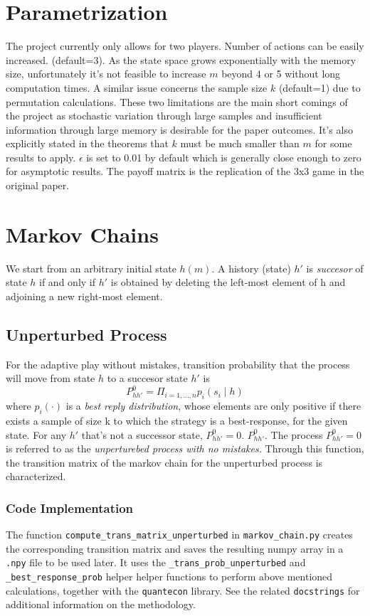 \documentclass[11pt, a4paper, leqno]{article}
\begin{document}
\section{Parametrization} %
\label{subsec:param}
The project currently only allows for two players. Number of actions can be easily increased. (default=3).
As the state space grows exponentially with the memory size, unfortunately it's not feasible to
increase $m$ beyond 4 or 5 without long computation times. A similar issue
concerns the sample size $k$ (default=1) due to permutation calculations. These two limitations are the main short comings
of the project as stochastic variation through large samples and insufficient information through
large memory is desirable for the paper outcomes. It's also explicitly stated in the theorems that $k$ must be much smaller than $m$
for some results to apply. $\epsilon$ is set to 0.01 by default which is generally close enough to
zero for asymptotic results. The payoff matrix is the replication of the 3x3 game in the original paper.


\section{Markov Chains} %
\label{subsec:mc}
We start from an arbitrary initial state $h(m)$. A history (state) $h'$ is \textit{succesor} of
state $h$ if and only if $h'$ is obtained by deleting the left-most element of h and adjoining
a new right-most element.

\subsection{Unperturbed Process} %
\label{subsec:mc_up}

For the adaptive play without mistakes, transition probability that the process will move from state
 $h$ to a succesor state $h'$ is
\[ P_{hh'}^{0} = \Pi_{i=1,...,n} p_i(s_i \mid h) \]
where $ p_i(\cdot)$ is a \textit{best reply distribution}, whose elements are only positive if there
exists a sample of size k to which the strategy is a best-response, for the given state. For any
$h'$ that's not a successor state, $P_{hh'}^{0} = 0$. $P_{hh'}^{0}$. The process $P_{hh'}^{0} = 0$
is referred to as the \textit{unperturebed process with no mistakes.} Through this function,
the transition matrix of the markov chain for the unperturbed process is characterized.

\subsubsection*{Code Implementation}
The function \texttt{compute\_trans\_matrix\_unperturbed} in \texttt{markov\_chain.py} creates the
corresponding transition matrix and saves the resulting numpy array in a \texttt{.npy} file to be
used later. It uses the \texttt{\_trans\_prob\_unperturbed} and \texttt{\_best\_response\_prob} helper
helper functions to perform above mentioned calculations, together with the \texttt{quantecon} library.
See the related \texttt{docstrings} for additional information on the methodology.
\end{document}
